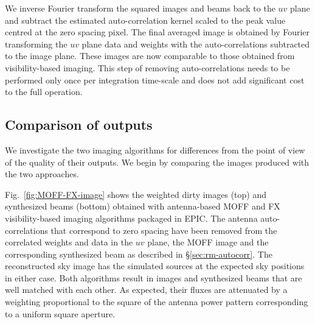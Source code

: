 \documentclass[a4paper,fleqn,usenatbib]{mnras}
\begin{document}
We inverse Fourier transform the squared images and beams back to the $uv$ plane and subtract the estimated auto-correlation kernel scaled to the peak value centred at the zero spacing pixel. The final averaged image is obtained by Fourier transforming the $uv$ plane data and weights with the auto-correlations subtracted to the image plane. These images are now comparable to those obtained from visibility-based imaging. This step of removing auto-correlations needs to be performed only once per integration time-scale and does not add significant cost to the full operation.

\subsection{Comparison of outputs}\label{sec:diff}

We investigate the two imaging algorithms for differences from the point of 
view of the quality of their outputs. We begin by comparing the images produced 
with the two approaches. 

Fig.~\ref{fig:MOFF-FX-image} shows the weighted dirty images (top) and synthesized beams (bottom) obtained with antenna-based MOFF and FX visibility-based imaging algorithms packaged in EPIC. The antenna auto-correlations that correspond to zero spacing have been removed from the correlated weights and data in the $uv$ plane, the MOFF image and the corresponding synthesized beam as described in \S\ref{sec:rm-autocorr}. The reconstructed sky image has the simulated sources at the expected sky positions in either case. Both algorithms result in images and synthesized beams that are well matched with each other. As expected, their fluxes are attenuated by a weighting proportional to the square of the antenna power pattern corresponding to a uniform square aperture. 
\end{document}
